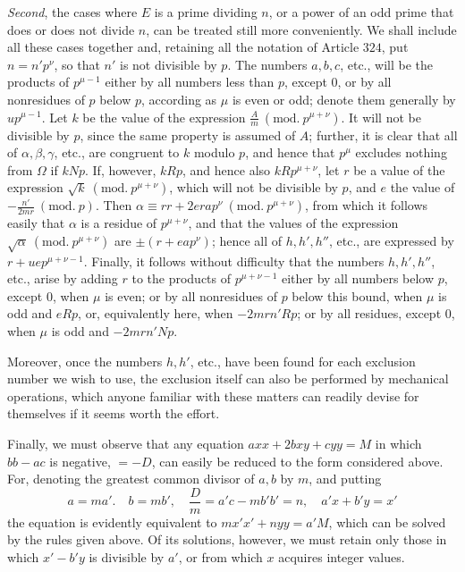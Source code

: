 \textit{Second}, the cases where \(E\) is a prime dividing \(n\), or a power of an odd prime that does or does not divide \(n\), can be treated still more conveniently. We shall include all these cases together and, retaining all the notation of Article \(324\), put \(n=n'p^\nu\), so that \(n'\) is not divisible by \(p\). The numbers \(a,\allowbreak b,\allowbreak c\), etc., will be the products of \(p^{\mu-1}\) either by all numbers less than \(p\), except \(0\), or by all nonresidues of \(p\) below \(p\), according as \(\mu\) is even or odd; denote them generally by \(up^{\mu-1}\). Let \(k\) be the value of the expression \(\frac Am\ (\mathrm{mod.}\ p^{\mu+\nu})\). It will not be divisible by \(p\), since the same property is assumed of \(A\);
further, it is clear that all of \(\alpha,\allowbreak \beta,\allowbreak \gamma\), etc., are congruent to \(k\) modulo \(p\), and hence that \(p^\mu\) excludes nothing from \(\Omega\) if \(kNp\). If, however, \(kRp\), and hence also \(kRp^{\mu+\nu}\), let \(r\) be a value of the expression \(\surd k\ (\mathrm{mod.}\ p^{\mu+\nu})\), which will not be divisible by \(p\), and \(e\) the value of \(-\frac{n'}{2mr}\ (\mathrm{mod.}\ p)\). Then \(\alpha\equiv rr+2era p^\nu\ (\mathrm{mod.}\ p^{\mu+\nu})\), from which it follows easily that \(\alpha\) is a residue of \(p^{\mu+\nu}\), and that the values of the expression \(\surd\alpha\ (\mathrm{mod.}\ p^{\mu+\nu})\) are \(\pm(r+ea p^\nu)\); hence all of \(h,\allowbreak h',\allowbreak h''\), etc., are expressed by \(r+uep^{\mu+\nu-1}\). Finally, it follows without difficulty that the numbers \(h,\allowbreak h',\allowbreak h''\), etc., arise by adding \(r\) to the products of \(p^{\mu+\nu-1}\) either by all numbers below \(p\), except \(0\), when \(\mu\) is even; or by all nonresidues of \(p\) below this bound, when \(\mu\) is odd and \(eRp\), or, equivalently here, when \(-2mrn'Rp\); or by all residues, except \(0\), when \(\mu\) is odd and \(-2mrn'Np\).

\begin{samepage}
Moreover, once the numbers \(h,\allowbreak h'\), etc., have been found for each exclusion number we wish to use, the exclusion itself can also be performed by mechanical operations, which anyone familiar with these matters can readily devise for themselves if it seems worth the effort.
\par\end{samepage}

Finally, we must observe that any equation \(axx+2bxy+cyy=M\) in which \(bb-ac\) is negative, \(=-D\), can easily be reduced to the form considered above. For, denoting the greatest common divisor of \(a,\allowbreak b\) by \(m\), and putting \[ a=ma'.\quad b=mb',\quad \frac Dm=a'c-mb'b'=n,\quad a'x+b'y=x' \] the equation is evidently equivalent to \(mx'x'+nyy=a'M\), which can be solved by the rules given above. Of its solutions, however, we must retain only those in which \(x'-b'y\) is divisible by \(a'\), or from which \(x\) acquires integer values.

